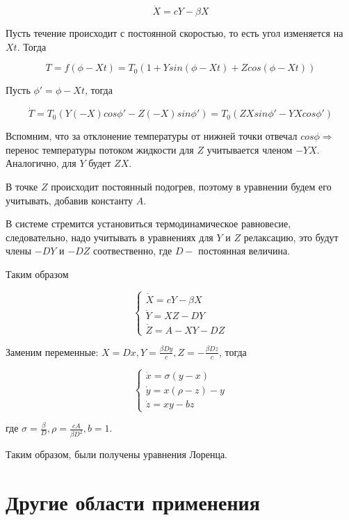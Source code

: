 \documentclass[12pt]{article}
\begin{document}
\begin{equation}
	\dot{X} = cY-\beta X
\end{equation}

Пусть течение происходит с постоянной скоростью, то есть угол изменяется на $Xt$. Тогда

\begin{equation}
	T=f(\phi-Xt)=T_0(1+Ysin(\phi-Xt)+Zcos(\phi-Xt))
\end{equation}

Пусть $\phi'=\phi-Xt$, тогда

\begin{equation}
	\dot{T}=T_0(Y(-X)cos\phi'-Z(-X)sin\phi')=T_0(ZXsin\phi'-YXcos\phi')
\end{equation}

Вспомним, что за отклонение температуры от нижней точки отвечал $cos\phi \Longrightarrow$ перенос температуры потоком жидкости для $Z$ учитывается членом $-YX$. Аналогично, для $Y$ будет $ZX$.

В точке $Z$ происходит постоянный подогрев, поэтому в уравнении будем его учитывать, добавив константу $A$. 

В системе стремится установиться термодинамическое равновесие, следовательно, надо учитывать в уравнениях для $Y$ и $Z$ релаксацию, это будут члены $-DY$ и $-DZ$ соотвественно, где $D -$ постоянная величина.

Таким образом

$$\begin{cases}
	\dot{X} = cY-\beta X \\
	\dot{Y} = XZ-DY \\
	\dot{Z} = A-XY-DZ
\end{cases}$$

Заменим переменные: $X=Dx, Y=\frac{\beta Dy}{c}, Z=-\frac{\beta Dz}{c}$, тогда

$$\begin{cases}	
	\dot{x} = \sigma (y-x) \\
	\dot{y} = x(\rho-z)-y \\
	\dot{z} = xy-bz
\end{cases}$$

где $\sigma = \frac{\beta}{D}, \rho=\frac{cA}{\beta D^2}, b=1$.

Таким образом, были получены уравнения Лоренца.

\section{Другие области применения}
\end{document}
